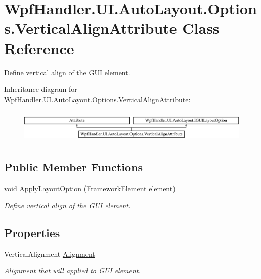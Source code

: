 \hypertarget{class_wpf_handler_1_1_u_i_1_1_auto_layout_1_1_options_1_1_vertical_align_attribute}{}\section{Wpf\+Handler.\+U\+I.\+Auto\+Layout.\+Options.\+Vertical\+Align\+Attribute Class Reference}
\label{class_wpf_handler_1_1_u_i_1_1_auto_layout_1_1_options_1_1_vertical_align_attribute}


Define vertical align of the G\+UI element.  


Inheritance diagram for Wpf\+Handler.\+U\+I.\+Auto\+Layout.\+Options.\+Vertical\+Align\+Attribute\+:\begin{figure}[H]
\begin{center}
\leavevmode
\includegraphics[height=1.642229cm]{d6/db9/class_wpf_handler_1_1_u_i_1_1_auto_layout_1_1_options_1_1_vertical_align_attribute}
\end{center}
\end{figure}
\subsection*{Public Member Functions}
\begin{DoxyCompactItemize}
\item 
void \mbox{\hyperlink{class_wpf_handler_1_1_u_i_1_1_auto_layout_1_1_options_1_1_vertical_align_attribute_a5a37e0bcf32b49da94e4f4d539fe810c}{Apply\+Layout\+Option}} (Framework\+Element element)
\begin{DoxyCompactList}\small\item\em Define vertical align of the G\+UI element. \end{DoxyCompactList}\end{DoxyCompactItemize}
\subsection*{Properties}
\begin{DoxyCompactItemize}
\item 
Vertical\+Alignment \mbox{\hyperlink{class_wpf_handler_1_1_u_i_1_1_auto_layout_1_1_options_1_1_vertical_align_attribute_a71a12b8962ff5c070830d42c1909ff75}{Alignment}}
\begin{DoxyCompactList}\small\item\em Alignment that will applied to G\+UI element. \end{DoxyCompactList}\end{DoxyCompactItemize}


